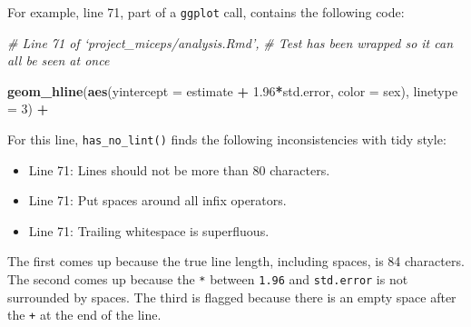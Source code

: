 \documentclass[12pt,twoside]{reedthesis}
\newenvironment{Shaded}{\begin{snugshade}}{\end{snugshade}}
\newcommand{\CommentTok}[1]{\textcolor[rgb]{0.56,0.35,0.01}{\textit{#1}}}
\newcommand{\DataTypeTok}[1]{\textcolor[rgb]{0.13,0.29,0.53}{#1}}
\newcommand{\DecValTok}[1]{\textcolor[rgb]{0.00,0.00,0.81}{#1}}
\newcommand{\FloatTok}[1]{\textcolor[rgb]{0.00,0.00,0.81}{#1}}
\newcommand{\KeywordTok}[1]{\textcolor[rgb]{0.13,0.29,0.53}{\textbf{#1}}}
\newcommand{\NormalTok}[1]{#1}
\newcommand{\OperatorTok}[1]{\textcolor[rgb]{0.81,0.36,0.00}{\textbf{#1}}}
\newcommand{\StringTok}[1]{\textcolor[rgb]{0.31,0.60,0.02}{#1}}
\begin{document}
For example, line 71, part of a \texttt{ggplot} call, contains the following code:
\begin{Shaded}
\begin{Highlighting}[]
\CommentTok{# Line 71 of `project_miceps/analysis.Rmd', }
\CommentTok{# Test has been wrapped so it can all be seen at once}

\KeywordTok{geom_hline}\NormalTok{(}\KeywordTok{aes}\NormalTok{(}\DataTypeTok{yintercept =}\NormalTok{ estimate }\OperatorTok{+}\StringTok{ }\FloatTok{1.96}\OperatorTok{*}\NormalTok{std.error, }\DataTypeTok{color =}\NormalTok{ sex),}
\DataTypeTok{linetype =} \DecValTok{3}\NormalTok{) }\OperatorTok{+}\StringTok{ }
\end{Highlighting}
\end{Shaded}
For this line, \texttt{has\_no\_lint()} finds the following inconsistencies with tidy style:
\begin{itemize}
\item
  Line 71: Lines should not be more than 80 characters.
\item
  Line 71: Put spaces around all infix operators.
\item
  Line 71: Trailing whitespace is superfluous.
\end{itemize}
The first comes up because the true line length, including spaces, is 84 characters. The second comes up because the \texttt{*} between \texttt{1.96} and \texttt{std.error} is not surrounded by spaces. The third is flagged because there is an empty space after the \texttt{+} at the end of the line.
\end{document}
